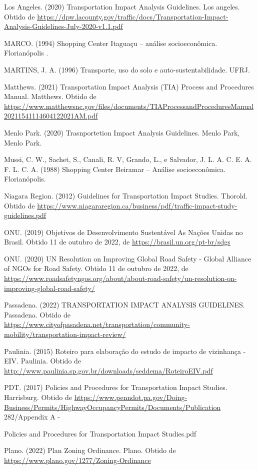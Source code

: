\documentclass[]{article}
\begin{document}
Los Angeles. (2020) Transportation Impact Analysis Guidelines. Los
angeles. Obtido de
\url{https://dpw.lacounty.gov/traffic/docs/Transportation-Impact-Analysis-Guidelines-July-2020-v1.1.pdf}

MARCO. (1994) Shopping Center Itaguaçu -- análise socioeconômica.
Florianópolis .

MARTINS, J. A. (1996) Transporte, uso do solo e auto-sustentabilidade.
UFRJ.

Matthews. (2021) Transportation Impact Analysis (TIA) Process and
Procedures Manual. Matthews. Obtido de
\url{https://www.matthewsnc.gov/files/documents/TIAProcessandProceduresManual20211541114604122021AM.pdf}

Menlo Park. (2020) Trasnportetion Impact Analysis Guidelines. Menlo
Park, Menlo Park.

Mussi, C. W., Sachet, S., Canali, R. V, Grando, L., e Salvador, J. L. A.
C. E. A. F. L. C. A. (1988) Shopping Center Beiramar -- Análise
socioeconômica. Florianópolis.

Niagara Region. (2012) Guidelines for Transportation Impact Studies.
Thorold. Obtido de
\url{https://www.niagararegion.ca/business/pdf/traffic-impact-study-guidelines.pdf}

ONU. (2019) Objetivos de Desenvolvimento Sustentável \textbar{} As
Nações Unidas no Brasil. Obtido 11 de outubro de 2022, de
\url{https://brasil.un.org/pt-br/sdgs}

ONU. (2020) UN Resolution on Improving Global Road Safety - Global
Alliance of NGOs for Road Safety. Obtido 11 de outubro de 2022, de
\url{https://www.roadsafetyngos.org/about/about-road-safety/un-resolution-on-improving-global-road-safety/}

Passadena. (2022) TRANSPORTATION IMPACT ANALYSIS GUIDELINES. Passadena.
Obtido de
\url{https://www.cityofpasadena.net/transportation/community-mobility/transportation-impact-review/}

Paulinia. (2015) Roteiro para elaboração do estudo de impacto de
vizinhança - EIV. Paulinia. Obtido de
\url{http://www.paulinia.sp.gov.br/downloads/seddema/RoteiroEIV.pdf}

PDT. (2017) Policies and Procedures for Transportation Impact Studies.
Harrisburg. Obtido de
\url{https://www.penndot.pa.gov/Doing-Business/Permits/HighwayOccupancyPermits/Documents/Publication}
282/Appendix A -

Policies and Procedures for Transportation Impact Studies.pdf

Plano. (2022) Plan Zoning Ordinance. Plano. Obtido de
\url{https://www.plano.gov/1277/Zoning-Ordinance}
\end{document}
